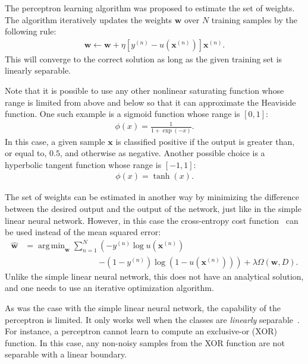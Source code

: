 \documentclass{now}
\newcommand{\vect}[1]{\mathbf{#1}}
\newcommand{\vx}[0]{\vect{x}}
\newcommand{\vw}[0]{\vect{w}}
\DeclareMathOperator*{\argmin}{arg\,min}
\begin{document}
The perceptron learning algorithm was proposed  to estimate the set of weights.
The algorithm iteratively updates the weights $\vw$ over $N$ training samples
by the following rule:
\begin{align*}
    \vw \leftarrow \vw + \eta \left[ y^{(n)} -
    u\left(\vx^{(n)}\right)
    \right] \vx^{(n)}.
\end{align*}
This will converge to the correct solution as long as the given training set is
linearly separable.

Note that it is possible to use any other nonlinear saturating function whose
range is limited from above and below so that it can approximate the Heaviside
function. One such example is a sigmoid function whose range is
$\left[ 0, 1 \right]$:
\begin{align}
    \label{eq:sigmoid}
    \phi(x) = \frac{1}{1 + \exp\left( -x\right)}.
\end{align}
In this case, a given sample $\vx$ is classified positive if the output is
greater than, or equal to, $0.5$, and otherwise as negative.  Another possible
choice is a hyperbolic tangent function whose range is $\left[ -1, 1 \right]$:
\begin{align}
    \label{eq:tanh}
    \phi(x) = \tanh(x).
\end{align}

The set of weights can be estimated in another way by minimizing the difference
between the desired output and the output of the network, just like in the
simple linear neural network. However, in this case the cross-entropy cost
function~\citep[see, e.g.][Chapter 4.3.2]{Bishop2006} can be used instead of the mean
squared error:
\begin{align}
    \label{eq:crossentropy_cost}
    \hat{\vw} &= \argmin_{\vw} \sum_{n=1}^N \left(-y^{(n)}
    \log u\left(\vx^{(n)}\right)\right.
    \nonumber\\
    &\phantom{= \argmin_{\vw} \sum_{n=1}^N}\left.-\left(1-y^{(n)}\right)
    \log\left( 1 - 
    u\left(\vx^{(n)}\right)\right)\right) 
    + \lambda \Omega
    \left(\vw, D\right).
\end{align}
Unlike the simple linear neural network, this does not have an analytical
solution, and one needs to use an iterative optimization algorithm.

As was the case with the simple linear neural network, the capability of the
perceptron is limited. It only works well when the classes are
\textit{linearly} separable~\citep[see, e.g.,][]{Minsky1969}. For instance, a
perceptron cannot learn to compute an exclusive-or
(XOR) function. In this case, any non-noisy
samples from the XOR function are not separable with a linear boundary.
\end{document}
